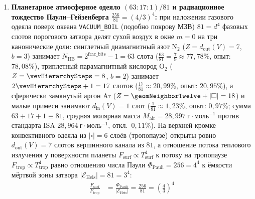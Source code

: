 \begin{theorem}[Классификация четырёх элементарных механизмов химических реакций по каналам $(V,E,\triangle,\square)$ и закон $8 = 3 + 2 + 3$ ферментативного катализа]
\begin{enumerate}[leftmargin=*]
  \begin{equation}
  \label{eq:bio-peroxide-disproportionation-enthalpy}
  \begin{aligned}
    -\Delta H_{\mathrm{rxn}}^{\circ}(\text{г}) &= d_{\mathrm{out}}(E)\,E_{\mathrm{HB}} = \mathbf{5\,E_{\mathrm{HB}}} \approx 104{,}19\ \text{кДж}\cdot\text{моль}^{-1}\quad (\text{NIST: } 105{,}52),\\
    -\Delta H_{\mathrm{rxn}}^{\circ}(\text{ж}) &= \left(d_{\mathrm{out}}(E) - s_0\right)E_{\mathrm{HB}} = \mathbf{\frac{9}{2}\,E_{\mathrm{HB}}} \approx 93{,}77\ \text{кДж}\cdot\text{моль}^{-1}\quad (\text{NIST: } 98{,}05).
  \end{aligned}
  \end{equation}
\item \textbf{Планетарное атмосферное одеяло $(63 : 17 : 1)/81$ и радиационное тождество Паули--Гейзенберга $\frac{256}{81} = (4/3)^4$:}
  при наложении газового одеяла поверх океана \texttt{VACUUM\_BOIL} (подобно покрову МЗВ) $81 = d^4$ фазовых слотов порогового затвора делят сухой воздух в окне $m=0$ на три канонические доли: синглетный диамагнитный азот $\mathrm{N_2}$ ($Z = d_{\mathrm{out}}(V) = 7$, $b=3$) занимает $N_{\mathrm{HB}} = 2^{\mathrm{frac\_bits}}-1 = 63$ слота ($\frac{63}{81} = \frac{7}{9} \approx 77{,}78\%$, опыт: $78{,}08\%$), триплетный парамагнитный кислород $\mathrm{O_2}$ ($Z = \vevHierarchySteps = 8$, $b=2$) занимает $2\vevHierarchySteps + 1 = 17$ слотов ($\frac{17}{81} \approx 20{,}99\%$, опыт: $20{,}95\%$), а сферически замкнутый аргон $\mathrm{Ar}$ ($Z = \geomNeighborTwelve + |\square| = 18$) и малые примеси занимают $d_{\mathrm{in}}(V) = 1$ слот ($\frac{1}{81} \approx 1{,}23\%$, опыт: $0{,}97\%$; сумма $63 + 17 + 1 \equiv 81$, средняя молярная масса $M_{\mathrm{air}} = 28{,}997\ \text{г}\cdot\text{моль}^{-1}$ против стандарта ISA $28{,}964\ \text{г}\cdot\text{моль}^{-1}$, откл.\ $0{,}11\%$).
  На верхней кромке конвективного одеяла из $|\square| = 6$ слоёв (тропопаузе) открыты ровно $d_{\mathrm{out}}(V) = 7$ слотов вершинного канала из $81$, а отношение потока теплового излучения у поверхности планеты $F_{\mathrm{surf}} \propto T_{\mathrm{surf}}^4$ к потоку на тропопаузе $F_{\mathrm{trop}} \propto T_{\mathrm{trop}}^4$ равно отношению числа Паули $\Phi_{\mathrm{Pauli}} = 256 = 4^4$ к ёмкости мёртвой зоны затвора $|\mathcal{E}_{\mathrm{Heis}}| = 81 = 3^4$:
  \begin{equation}
  \label{eq:bio-planetary-blanket-pauli-heisenberg}
  \begin{aligned}
    \frac{F_{\mathrm{surf}}}{F_{\mathrm{trop}}} &= \frac{\Phi_{\mathrm{Pauli}}}{|\mathcal{E}_{\mathrm{Heis}}|} = \frac{256}{81} = \left(\frac{4}{3}\right)^{\!4}

\end{aligned}
\end{equation}
\end{enumerate}
\end{theorem}
